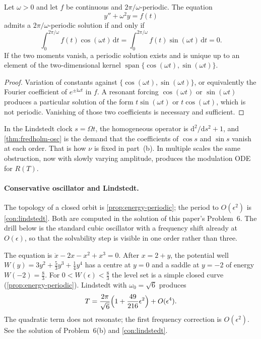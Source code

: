 \documentclass[11pt,a4paper]{article}
\begin{document}
\begin{theorem}
\label{thm:fredholm-osc}
Let \(\omega>0\) and let \(f\) be continuous and \(2\pi/\omega\)-periodic. The equation
\[
y''+\omega^{2} y=f(t)
\]
admits a \(2\pi/\omega\)-periodic solution if and only if
\[
\int_{0}^{2\pi/\omega}f(t)\cos(\omega t)\,\mathrm{d}t
=
\int_{0}^{2\pi/\omega}f(t)\sin(\omega t)\,\mathrm{d}t
=
0.
\]
If the two moments vanish, a periodic solution exists and is unique up to an element of the two-dimensional kernel \(\operatorname{span}\{\cos(\omega t),\sin(\omega t)\}\).
\end{theorem}

\begin{proof}
Variation of constants against \(\{\cos(\omega t),\sin(\omega t)\}\), or equivalently the Fourier coefficient of \(e^{\pm\mathrm{i}\omega t}\) in \(f\). A resonant forcing \(\cos(\omega t)\) or \(\sin(\omega t)\) produces a particular solution of the form \(t\sin(\omega t)\) or \(t\cos(\omega t)\), which is not periodic. Vanishing of those two coefficients is necessary and sufficient.
\end{proof}

\begin{remark}
\label{rem:fredholm-p6}
In the Lindstedt clock \(s=\Omega t\), the homogeneous operator is \(\mathrm{d}^{2}/\mathrm{d}s^{2}+1\), and \cref{thm:fredholm-osc} is the demand that the coefficients of \(\cos s\) and \(\sin s\) vanish at each order. That is how \(\nu\) is fixed in part~(b). In multiple scales the same obstruction, now with slowly varying amplitude, produces the modulation ODE for \(R(T)\).
\end{remark}

\paragraph{Conservative oscillator and Lindstedt.}

The topology of a closed orbit is \cref{prop:energy-periodic}; the period to \(O(\epsilon^{2})\) is \cref{con:lindstedt}. Both are computed in the solution of this paper's Problem~6. The drill below is the standard cubic oscillator with a frequency shift already at \(O(\epsilon)\), so that the solvability step is visible in one order rather than three.

\begin{example}
\label{ex:p6-lindstedt}
The equation is \(\ddot x-2x-x^{2}+x^{3}=0\). After \(x=2+y\), the potential well \(W(y)=3y^{2}+\frac53 y^{3}+\frac14 y^{4}\) has a centre at \(y=0\) and a saddle at \(y=-2\) of energy \(W(-2)=\frac83\). For \(0<W(\epsilon)<\frac83\) the level set is a simple closed curve (\cref{prop:energy-periodic}). Lindstedt with \(\omega_{0}=\sqrt{6}\) produces
\[
T
=
\frac{2\pi}{\sqrt{6}}\Bigl(1+\frac{49}{216}\epsilon^{2}\Bigr)+O(\epsilon^{4}).
\]
The quadratic term does not resonate; the first frequency correction is \(O(\epsilon^{2})\). See the solution of Problem~6(b) and \cref{con:lindstedt}.
\end{example}
\end{document}

